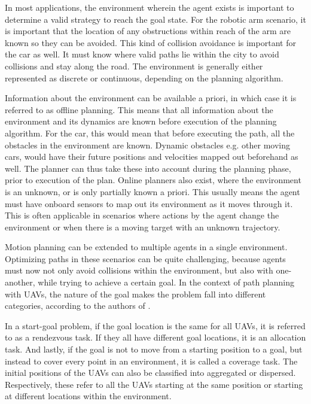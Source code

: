 In most applications, the environment wherein the agent exists is important to determine a valid strategy to reach the goal state. For the robotic arm scenario, it is important that the location of any obstructions within reach of the arm are known so they can be avoided. This kind of collision avoidance is important for the car as well. It must know where valid paths lie within the city to avoid collisions and stay along the road. The environment is generally either represented as discrete or continuous, depending on the planning algorithm.

Information about the environment can be available a priori, in which case it is referred to as offline planning. This means that all information about the environment and its dynamics are known before execution of the planning algorithm. For the car, this would mean that before executing the path, all the obstacles in the environment are known. Dynamic obstacles e.g. other moving cars, would have their future positions and velocities mapped out beforehand as well. The planner can thus take these into account during the planning phase, prior to execution of the plan. Online planners also exist, where the environment is an unknown, or is only partially known a priori. This usually means the agent must have onboard sensors to map out its environment as it moves through it. This is often applicable in scenarios where actions by the agent change the environment or when there is a moving target with an unknown trajectory.

Motion planning can be extended to multiple agents in a single environment. Optimizing paths in these scenarios can be quite challenging, because agents must now not only avoid collisions within the environment, but also with one-another, while trying to achieve a certain goal. In the context of path planning with \acsp{UAV}, the nature of the goal makes the problem fall into different categories, according to the authors of \cite{Zhang2020}. 

In a start-goal problem, if the goal location is the same for all \acsp{UAV}, it is referred to as a rendezvous task. If they all have different goal locations, it is an allocation task. And lastly, if the goal is not to move from a starting position to a goal, but instead to cover every point in an environment, it is called a coverage task. The initial positions of the \acsp{UAV} can also be  classified into aggregated or dispersed. Respectively, these refer to all the UAVs starting at the same position or starting at different locations within the environment.

